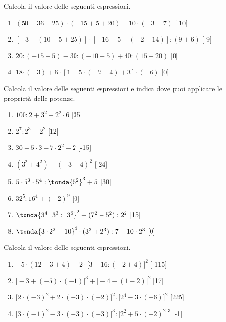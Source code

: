 \begin{esercizio} %
Calcola il valore delle seguenti espressioni.
 \begin{enumerate}[noitemsep, label=(\alph*)]
 \item \((50-36-25)\cdot (-15+5+20)-10\cdot (-3-7)\) \hfill[-10]
 \item \([+3-(10-5+25)]\cdot [-16+5-(-2-14)]:(9+6)\) \hfill[-9]
 \item \(20:(+15-5)-30:(-10+5)+40:(15-20)\) \hfill[0]
 \item \(18:(-3)+6\cdot [1-5\cdot (-2+4)+3]: (-6)\) \hfill[0]
\end{enumerate}
\end{esercizio}

\begin{esercizio} %
Calcola il valore delle seguenti espressioni e indica dove puoi applicare le 
proprietà delle potenze.

\vspace{-.5em}
\begin{multicols}{2}
\begin{enumerate}[noitemsep, label=(\alph*)]
 \item \(100:2+3^2 -2^2\cdot 6\) \hfill[35]
 \item \(2^7:2^3 -2^2\) \hfill[12]
 \item \(30-5\cdot 3 -7\cdot 2^2 -2\) \hfill[-15]
 \item \((3^2 +4^2) -(-3-4)^2\) \hfill[-24]
 \item \(5\cdot 5^3\cdot 5^4: \tonda{5^2 }^3 +5\) \hfill[30]
 \item \(32^5:16^4 +(-2)^9\) \hfill[0]
 \item \(\tonda{3^4\cdot 3^3:~3^6 }^2 +(7^2-5^2):2^2\) \hfill[15]
 \item \(\tonda{3\cdot 2^2 -10 }^4\cdot (3^3+2^3):7-10\cdot 2^3\) \hfill[0]
\end{enumerate}
\end{multicols}
\end{esercizio}

\begin{esercizio} %
Calcola il valore delle seguenti espressioni.
 \begin{enumerate}[noitemsep, label=(\alph*)]
 \item \(-5\cdot(12-3+4)-2\cdot\big[3-16:(-2+4)\big]^2\) \hfill[-115]
 \item \(\big[-3+(-5)\cdot(-1)\big]^3+\big[-4-(1-2)\big]^2\) \hfill[17]
 \item 
\(\big[2\cdot(-3)^2+2\cdot(-3)\cdot(-2)\big]^2:\big[2^4-3\cdot(+6)\big]^2\)
 \hfill[225]
 \item 
\(\big[3\cdot(-1)^2-3\cdot(-3)\cdot(-3)\big]^3:\big[2^2+5\cdot(-2)^2\big]^3\)
 \hfill[-1]
 \end{enumerate}
\end{esercizio}

